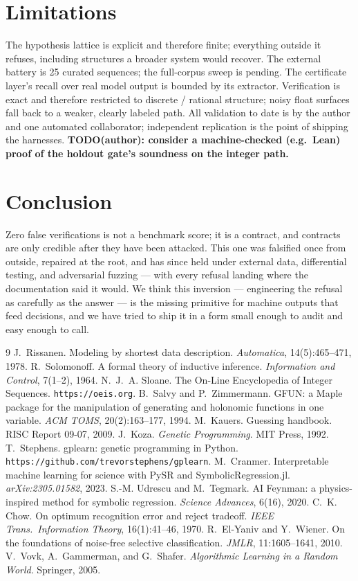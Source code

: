 \documentclass[11pt]{article}
\begin{document}
\section{Limitations}
The hypothesis lattice is explicit and therefore finite; everything outside
it refuses, including structures a broader system would recover. The
external battery is 25 curated sequences; the full-corpus sweep is pending.
The certificate layer's recall over real model output is bounded by its
extractor. Verification is exact and therefore restricted to discrete /
rational structure; noisy float surfaces fall back to a weaker, clearly
labeled path. All validation to date is by the author and one automated
collaborator; independent replication is the point of shipping the
harnesses. \textbf{TODO(author): consider a machine-checked (e.g.\ Lean)
proof of the holdout gate's soundness on the integer path.}

\section{Conclusion}
Zero false verifications is not a benchmark score; it is a contract, and
contracts are only credible after they have been attacked. This one was
falsified once from outside, repaired at the root, and has since held under
external data, differential testing, and adversarial fuzzing --- with every
refusal landing where the documentation said it would. We think this
inversion --- engineering the refusal as carefully as the answer --- is the
missing primitive for machine outputs that feed decisions, and we have
tried to ship it in a form small enough to audit and easy enough to call.

\begin{thebibliography}{9}\small
{} J.~Rissanen. Modeling by shortest data description.
\emph{Automatica}, 14(5):465--471, 1978.
 R.~Solomonoff. A formal theory of inductive
inference. \emph{Information and Control}, 7(1--2), 1964.
 N.~J.~A. Sloane. The On-Line Encyclopedia of Integer
Sequences. \texttt{https://oeis.org}.
 B.~Salvy and P.~Zimmermann. GFUN: a Maple package for
the manipulation of generating and holonomic functions in one variable.
\emph{ACM TOMS}, 20(2):163--177, 1994.
 M.~Kauers. Guessing handbook. RISC Report 09-07, 2009.
 J.~Koza. \emph{Genetic Programming}. MIT Press, 1992.
 T.~Stephens. gplearn: genetic programming in Python.
\texttt{https://github.com/trevorstephens/gplearn}.
 M.~Cranmer. Interpretable machine learning for science
with PySR and SymbolicRegression.jl. \emph{arXiv:2305.01582}, 2023.
 S.-M. Udrescu and M.~Tegmark. AI Feynman: a
physics-inspired method for symbolic regression. \emph{Science Advances},
6(16), 2020.
 C.~K. Chow. On optimum recognition error and reject
tradeoff. \emph{IEEE Trans.\ Information Theory}, 16(1):41--46, 1970.
 R.~El-Yaniv and Y.~Wiener. On the foundations of
noise-free selective classification. \emph{JMLR}, 11:1605--1641, 2010.
 V.~Vovk, A.~Gammerman, and G.~Shafer. \emph{Algorithmic
Learning in a Random World}. Springer, 2005.
\end{thebibliography}
\end{document}
